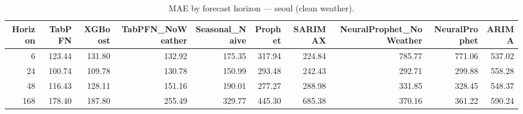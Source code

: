 \begin{table}[ht!]
\centering
\caption{MAE by forecast horizon — seoul (clean weather).}
\label{tab:mae_by_horizon_seoul}
\begin{tabular}{rrrrrrrrrr}
\toprule
Horizon & TabPFN & XGBoost & TabPFN_NoWeather & Seasonal_Naive & Prophet & SARIMAX & NeuralProphet_NoWeather & NeuralProphet & ARIMA \\
\midrule
6 & 123.44 & 131.80 & 132.92 & 175.35 & 317.94 & 224.84 & 785.77 & 771.06 & 537.02 \\
24 & 100.74 & 109.78 & 130.78 & 150.99 & 293.48 & 242.43 & 292.71 & 299.88 & 558.28 \\
48 & 116.43 & 128.11 & 151.16 & 190.01 & 277.27 & 288.98 & 331.85 & 328.45 & 548.37 \\
168 & 178.40 & 187.80 & 255.49 & 329.77 & 445.30 & 685.38 & 370.16 & 361.22 & 590.24 \\
\bottomrule
\end{tabular}
\end{table}
